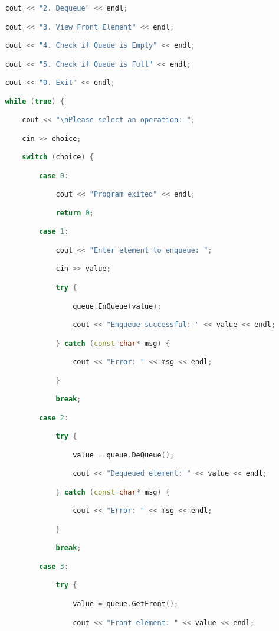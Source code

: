 \begin{lstlisting}[language=C++]
    cout << "2. Dequeue" << endl;

    cout << "3. View Front Element" << endl;

    cout << "4. Check if Queue is Empty" << endl;

    cout << "5. Check if Queue is Full" << endl;

    cout << "0. Exit" << endl;

    while (true) {

        cout << "\nPlease select an operation: ";

        cin >> choice;

        switch (choice) {

            case 0:

                cout << "Program exited" << endl;

                return 0;

            case 1:

                cout << "Enter element to enqueue: ";

                cin >> value;

                try {

                    queue.EnQueue(value);

                    cout << "Enqueue successful: " << value << endl;

                } catch (const char* msg) {

                    cout << "Error: " << msg << endl;

                }

                break;

            case 2:

                try {

                    value = queue.DeQueue();

                    cout << "Dequeued element: " << value << endl;

                } catch (const char* msg) {

                    cout << "Error: " << msg << endl;

                }

                break;

            case 3:

                try {

                    value = queue.GetFront();

                    cout << "Front element: " << value << endl;


\end{lstlisting}
